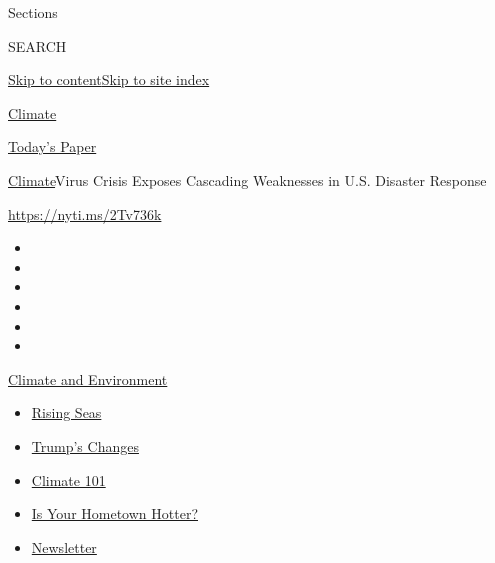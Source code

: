 Sections

SEARCH

\protect\hyperlink{site-content}{Skip to
content}\protect\hyperlink{site-index}{Skip to site index}

\href{https://www.nytimes3xbfgragh.onion/section/climate}{Climate}

\href{https://myaccount.nytimes3xbfgragh.onion/auth/login?response_type=cookie\&client_id=vi}{}

\href{https://www.nytimes3xbfgragh.onion/section/todayspaper}{Today's
Paper}

\href{/section/climate}{Climate}\textbar{}Virus Crisis Exposes Cascading
Weaknesses in U.S. Disaster Response

\url{https://nyti.ms/2Tv736k}

\begin{itemize}
\item
\item
\item
\item
\item
\item
\end{itemize}

\href{https://www.nytimes3xbfgragh.onion/section/climate?action=click\&pgtype=Article\&state=default\&region=TOP_BANNER\&context=storylines_menu}{Climate
and Environment}

\begin{itemize}
\tightlist
\item
  \href{https://www.nytimes3xbfgragh.onion/2020/07/30/climate/sea-level-inland-floods.html?action=click\&pgtype=Article\&state=default\&region=TOP_BANNER\&context=storylines_menu}{Rising
  Seas}
\item
  \href{https://www.nytimes3xbfgragh.onion/interactive/2020/climate/trump-environment-rollbacks.html?action=click\&pgtype=Article\&state=default\&region=TOP_BANNER\&context=storylines_menu}{Trump's
  Changes}
\item
  \href{https://www.nytimes3xbfgragh.onion/interactive/2020/04/19/climate/climate-crash-course-1.html?action=click\&pgtype=Article\&state=default\&region=TOP_BANNER\&context=storylines_menu}{Climate
  101}
\item
  \href{https://www.nytimes3xbfgragh.onion/interactive/2018/08/30/climate/how-much-hotter-is-your-hometown.html?action=click\&pgtype=Article\&state=default\&region=TOP_BANNER\&context=storylines_menu}{Is
  Your Hometown Hotter?}
\item
  \href{https://www.nytimes3xbfgragh.onion/newsletters/climate-change?action=click\&pgtype=Article\&state=default\&region=TOP_BANNER\&context=storylines_menu}{Newsletter}
\end{itemize}

